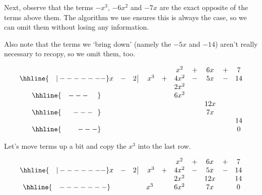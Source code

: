 \documentclass{ximera}
\begin{document}
\setlength\arraycolsep{5pt}
\setlength\extrarowheight{0pt}


Next, observe that the terms $-x^3$, $-6x^2$ and $-7x$ are the exact opposite of the terms above them.  The algorithm we use ensures this is always the case, so we can omit them without losing any information.

\medskip

 Also note that the terms we `bring down' (namely the $-5x$ and $-14$) aren't really necessary to recopy, so we omit them, too.


\setlength\arraycolsep{0.1pt}
\setlength\extrarowheight{2pt}

\[ \begin{array}{cccccccccc}

& & & & & x^2 & + & 6x & + & 7 \\ \hhline{~~~|-------}

x & - & 2 \, \vline& \, \, x^3 & + & 4x^2 & - & 5x & - & 14 \\

 &  &  &   &  &   2x^2 &  &  &  &  \\ \hhline{~~~---~~~~} 
 &  &  &   &  & 6 x^2 &  &  &  &  \\ 
 &  &  &   & &  &  &  12x &  &  \\ \hhline{~~~~~---~~} 
 &  &  &   &   &  & & 7x  &  &  \\
 &  &  &   &   &  & &   &  &  14  \\ \hhline{~~~~~~~---} 
 &   &  &  &  &  &  &  &  & 0
 
\end{array}\]

\setlength\arraycolsep{5pt}
\setlength\extrarowheight{0pt}

Let's move terms up a bit and copy the $x^3$ into the last row.


\setlength\arraycolsep{0.1pt}
\setlength\extrarowheight{2pt}

\[ \begin{array}{cccccccccc}

& & & & & x^2 & + & 6x & + & 7 \\ \hhline{~~~|-------}

x & - & 2 \, \vline& \, \, x^3 & + & 4x^2 & - & 5x & - & 14 \\

 &  &  &   & &   2x^2 &  & 12x &  & 14 \\ \hhline{~~~-------} 
 &  &  & x^3  &  & 6 x^2 &  & 7x &  &0  \\  
\end{array}\]
\end{document}
